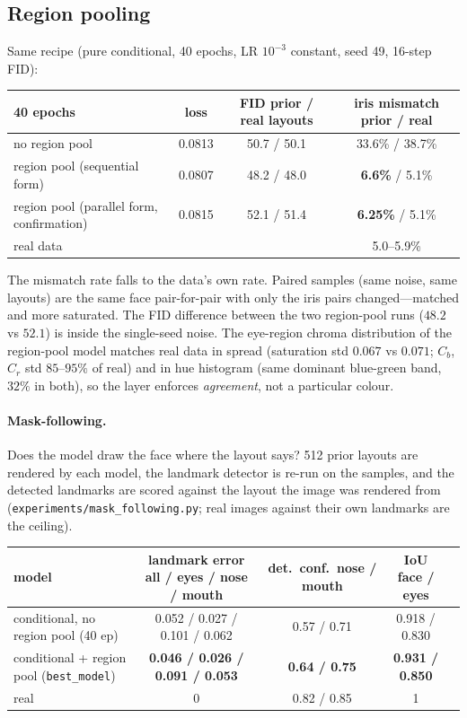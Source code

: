 \documentclass[11pt]{article}
\begin{document}
\subsection{Region pooling}

Same recipe (pure conditional, 40 epochs, LR $10^{-3}$ constant, seed 49, 16-step FID):

\begin{center}\small
\begin{tabular}{lccc}
\toprule
40 epochs & loss & FID prior / real layouts & iris mismatch prior / real \\
\midrule
no region pool & 0.0813 & 50.7 / 50.1 & 33.6\% / 38.7\% \\
region pool (sequential form) & 0.0807 & 48.2 / 48.0 & \textbf{6.6\%} / 5.1\% \\
region pool (parallel form, confirmation) & 0.0815 & 52.1 / 51.4 & \textbf{6.25\%} / 5.1\% \\
real data & & & 5.0--5.9\% \\
\bottomrule
\end{tabular}
\end{center}

The mismatch rate falls to the data's own rate. Paired samples (same noise, same
layouts) are the same face pair-for-pair with only the iris pairs changed---matched and
more saturated. The FID difference between the two region-pool runs ($48.2$ vs $52.1$)
is inside the single-seed noise. The eye-region chroma distribution of the region-pool
model matches real data in spread (saturation std $0.067$ vs $0.071$; $C_b$, $C_r$ std
$85$--$95\%$ of real) and in hue histogram (same dominant blue-green band, $32\%$ in
both), so the layer enforces \emph{agreement}, not a particular colour.

\paragraph{Mask-following.} Does the model draw the face where the layout says?
512 prior layouts are rendered by each model, the landmark detector is re-run on the
samples, and the detected landmarks are scored against the layout the image was
rendered from (\texttt{experiments/mask\_following.py}; real images against their own
landmarks are the ceiling).

\begin{center}\small
\begin{tabular}{lcccc}
\toprule
model & landmark error all / eyes / nose / mouth & det.\ conf.\ nose / mouth & IoU face / eyes \\
\midrule
conditional, no region pool (40 ep) & 0.052 / 0.027 / 0.101 / 0.062 & 0.57 / 0.71 & 0.918 / 0.830 \\
conditional + region pool (\texttt{best\_model}) & \textbf{0.046 / 0.026 / 0.091 / 0.053} & \textbf{0.64 / 0.75} & \textbf{0.931 / 0.850} \\
real & 0 & 0.82 / 0.85 & 1 \\
\bottomrule
\end{tabular}
\end{center}
\end{document}
